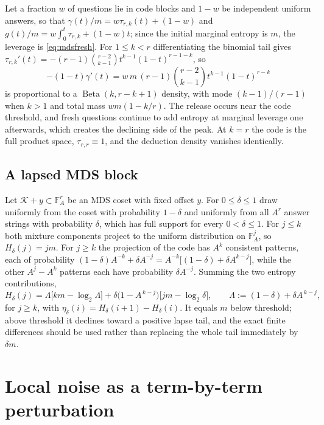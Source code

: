Let a fraction $w$ of questions lie in code blocks and $1-w$ be
independent uniform answers, so that
$\gamma(t)/m = w\tau_{r,k}(t)+(1-w)$ and
$g(t)/m = w\int_0^t\tau_{r,k}+(1-w)t$; since the initial marginal
entropy is $m$, the leverage is \eqref{eq:mdsfresh}. For
$1\le k<r$ differentiating the binomial tail gives
$\tau_{r,k}'(t) = -(r-1)\binom{r-2}{k-1}t^{k-1}(1-t)^{r-1-k}$, so
%
\begin{equation}
  -(1-t)\gamma'(t)
  = w\,m\,(r-1)\binom{r-2}{k-1}t^{k-1}(1-t)^{r-k} 
  \label{eq:appmdsrelease}
\end{equation}
%
is proportional to a $\operatorname{Beta}(k,r-k+1)$ density, with
mode $(k-1)/(r-1)$ when $k>1$ and total mass $wm(1-k/r)$. The
release occurs near the code threshold, and fresh questions continue
to add entropy at marginal leverage one afterwards, which creates the
declining side of the peak. At $k = r$ the code is the full product
space, $\tau_{r,r}\equiv1$, and the deduction density vanishes
identically.

\subsection{A lapsed MDS block}

Let $\mathcal K + y\subset\mathbb F_{A}^r$ be an MDS coset with fixed
offset $y$. For $0\le\delta\le1$ draw uniformly from the coset with
probability $1-\delta$ and uniformly from all $A^r$ answer strings
with probability $\delta$, which has full support for every
$0<\delta\le1$. For $j\le k$ both mixture components project to the
uniform distribution on $\mathbb F_{A}^j$, so $H_\delta(j) = jm$. For
$j\ge k$ the projection of the code has $A^k$ consistent patterns,
each of probability
$(1-\delta)A^{-k}+\delta A^{-j} = A^{-k}\big[(1-\delta)+\delta
A^{k-j}\big]$, while the other $A^j-A^k$ patterns each have
probability $\delta A^{-j}$. Summing the two entropy contributions,
%
\begin{equation}
  H_\delta(j)
  = \Lambda\big[km-\log_2\Lambda\big]
  + \delta\big(1-A^{\,k-j}\big)\big[jm-\log_2\delta\big],
  \qquad
  \Lambda := (1-\delta)+\delta A^{\,k-j},
  \label{eq:applapsed}
\end{equation}
%
for $j\ge k$, with $\eta_\delta(i) = H_\delta(i+1)-H_\delta(i)$. It
equals $m$ below threshold; above threshold it declines toward a
positive lapse tail, and the exact finite differences should be used
rather than replacing the whole tail immediately by $\delta m$.

\section{Local noise as a term-by-term
perturbation}\label{app:noise}

